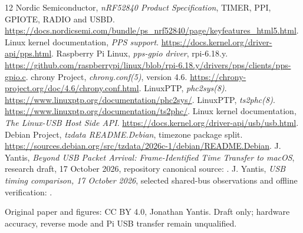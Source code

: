 \documentclass[10pt,letterpaper]{article}
\begin{document}
\begin{thebibliography}{12}\small
{} Nordic Semiconductor, \emph{nRF52840 Product Specification},
TIMER, PPI, GPIOTE, RADIO and USBD.
\url{https://docs.nordicsemi.com/bundle/ps_nrf52840/page/keyfeatures_html5.html}.
 Linux kernel documentation, \emph{PPS support}.
\url{https://docs.kernel.org/driver-api/pps.html}.
 Raspberry Pi Linux, \emph{pps-gpio driver}, rpi-6.18.y.
\url{https://github.com/raspberrypi/linux/blob/rpi-6.18.y/drivers/pps/clients/pps-gpio.c}.
 chrony Project, \emph{chrony.conf(5)}, version 4.6.
\url{https://chrony-project.org/doc/4.6/chrony.conf.html}.
 LinuxPTP, \emph{phc2sys(8)}.
\url{https://www.linuxptp.org/documentation/phc2sys/}.
 LinuxPTP, \emph{ts2phc(8)}.
\url{https://www.linuxptp.org/documentation/ts2phc/}.
 Linux kernel documentation, \emph{The Linux-USB Host Side API}.
\url{https://docs.kernel.org/driver-api/usb/usb.html}.
 Debian Project, \emph{tzdata README.Debian}, timezone package split.
\url{https://sources.debian.org/src/tzdata/2026c-1/debian/README.Debian}.
 J. Yantis, \emph{Beyond USB Packet Arrival: Frame-Identified Time Transfer to macOS},
research draft, 17 October 2026, repository canonical source:
.
 J. Yantis, \emph{USB timing comparison, 17 October 2026},
selected shared-bus observations and offline verification:
.
\end{thebibliography}
\vspace{0.5em}
{\footnotesize Original paper and figures: CC BY 4.0, Jonathan Yantis.
Draft only; hardware accuracy, reverse mode and Pi USB transfer remain unqualified.}
\end{document}
